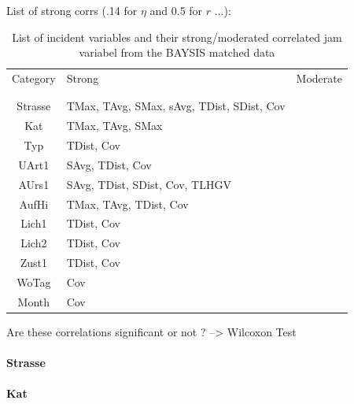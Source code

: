 \documentclass[a4paper,headsepline,footsepline,fontsize=11pt,BCOR=12mm,DIV=12]{report}
\begin{document}
List of strong corrs (.14 for $\eta$ and 0.5 for $r$ ...):

\noindent
\begin{table}[h!]
	\centering
	\begin{tabular}{c|l|l}  
		Category & Strong & Moderate \\
		\\[-1em]
		\hline
		\\[-1em]
		Strasse & TMax, TAvg, SMax, sAvg, TDist, SDist, Cov & \\ 
 		Kat & TMax, TAvg, SMax & \\ 
 		Typ & TDist, Cov & \\
 		UArt1 & SAvg, TDist, Cov & \\
 		AUrs1 & SAvg, TDist, SDist, Cov, TLHGV & \\
 		AufHi & TMax, TAvg, TDist, Cov & \\
 		Lich1 & TDist, Cov & \\
 		Lich2 & TDist, Cov & \\
 		Zust1 & TDist, Cov & \\
 		WoTag & Cov & \\
 		Month & Cov & \\
	\end{tabular}
	\caption{List of incident variables and their strong/moderated correlated jam variabel from the BAYSIS matched data}
\end{table}

Are these correlations significant or not ? --> Wilcoxon Test

\paragraph{Strasse}

\paragraph{Kat}
\end{document}
